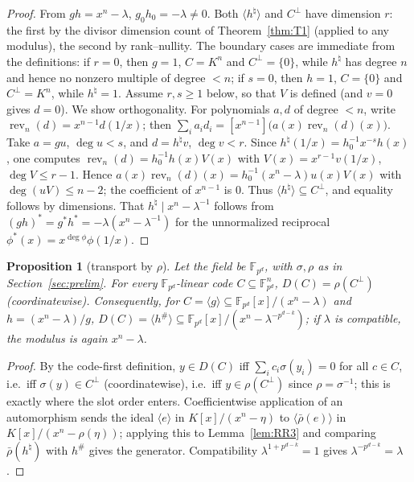 \documentclass[11pt]{article}
\newtheorem{proposition}[theorem]{Proposition}
\theoremstyle{definition}
\theoremstyle{remark}
\begin{document}
\begin{proof}
From \(gh = x^n - \lambda\), \(g_0 h_0 = -\lambda \ne 0\). Both
\(\langle h^{\natural} \rangle\) and \(C^\perp\) have dimension \(r\):
the first by the divisor dimension count of Theorem~\ref{thm:T1}
(applied to any modulus), the second by rank--nullity. The boundary
cases are immediate from the definitions: if \(r = 0\), then \(g = 1\),
\(C = K^n\) and \(C^\perp = \{0\}\), while \(h^{\natural}\) has degree
\(n\) and hence no nonzero multiple of degree \(< n\); if \(s = 0\), then
\(h = 1\), \(C = \{0\}\) and \(C^\perp = K^n\), while
\(h^{\natural} = 1\). Assume \(r, s \ge 1\) below, so that \(V\) is
defined (and \(v = 0\) gives \(d = 0\)). We show orthogonality. For polynomials \(a, d\) of degree \(< n\), write
\(\operatorname{rev}_n(d) = x^{n-1} d(1/x)\); then
\(\sum_i a_i d_i = [x^{n-1}]\big(a(x) \operatorname{rev}_n(d)(x)\big)\).
Take \(a = gu\), \(\deg u < s\), and \(d = h^{\natural} v\),
\(\deg v < r\). Since
\(h^{\natural}(1/x) = h_0^{-1} x^{-s} h(x)\), one computes
\(\operatorname{rev}_n(d) = h_0^{-1} h(x) V(x)\) with
\(V(x) = x^{r-1} v(1/x)\), \(\deg V \le r-1\). Hence
\(a(x)\operatorname{rev}_n(d)(x) = h_0^{-1} (x^n - \lambda) u(x) V(x)\)
with \(\deg(uV) \le n-2\); the coefficient of \(x^{n-1}\) is \(0\).
Thus \(\langle h^{\natural}\rangle \subseteq C^\perp\), and equality
follows by dimensions. That \(h^{\natural} \mid x^n - \lambda^{-1}\)
follows from \((gh)^* = g^* h^* = -\lambda(x^n - \lambda^{-1})\) for the
unnormalized reciprocal \(\phi^*(x) = x^{\deg\phi}\phi(1/x)\).
\end{proof}

\begin{proposition}[transport by \(\rho\)]\label{prop:transport}
Let the field be \(\mathbb{F}_{p^d}\), with \(\sigma, \rho\) as in
Section~\ref{sec:prelim}. For every \(\mathbb{F}_{p^d}\)-linear code
\(C \subseteq \mathbb{F}_{p^d}^n\),
\(D(C) = \rho(C^\perp)\) (coordinatewise). Consequently, for
\(C = \langle g \rangle \subseteq \mathbb{F}_{p^d}[x]/(x^n-\lambda)\) and
\(h = (x^n-\lambda)/g\),
\(D(C) = \langle h^{\#} \rangle \subseteq
\mathbb{F}_{p^d}[x]/(x^n - \lambda^{-p^{d-k}})\); if \(\lambda\) is
compatible, the modulus is again \(x^n - \lambda\).
\end{proposition}

\begin{proof}
By the code-first definition, \(y \in D(C)\) iff
\(\sum_i c_i \sigma(y_i) = 0\) for all \(c \in C\), i.e.\ iff
\(\sigma(y) \in C^\perp\) (coordinatewise), i.e.\ iff
\(y \in \rho(C^\perp)\) since \(\rho = \sigma^{-1}\); this is exactly
where the slot order enters. Coefficientwise application of an
automorphism sends the ideal \(\langle e \rangle\) in
\(K[x]/(x^n-\eta)\) to \(\langle \bar\rho(e)\rangle\) in
\(K[x]/(x^n - \rho(\eta))\); applying this to Lemma~\ref{lem:RR3} and
comparing \(\bar\rho(h^{\natural})\) with \(h^{\#}\) gives the generator.
Compatibility \(\lambda^{1+p^{d-k}}=1\) gives
\(\lambda^{-p^{d-k}} = \lambda\).
\end{proof}
\end{document}
